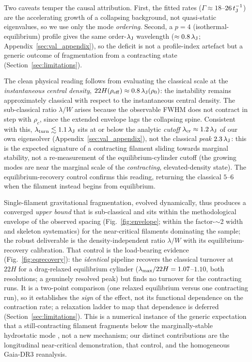 \documentclass[usenatbib,twoside,twocolumn]{mnras}
\begin{document}
Two caveats temper the causal attribution. First, the fitted rates ($\Gamma\approx18$--$26\,t_{\rm J}^{-1}$) are the accelerating growth of a collapsing background, not quasi-static eigenvalues, so we use only the mode \emph{ordering}. Second, a $p=4$ (isothermal-equilibrium) profile gives the same order-$\lambda_{\rm J}$ wavelength ($\approx0.8\,\lambda_{\rm J}$; Appendix~\ref{sec:val_appendix}), so the deficit is not a profile-index artefact but a generic outcome of fragmentation from a contracting state (Section~\ref{sec:limitations}).

The clean physical reading follows from evaluating the classical scale at the \emph{instantaneous central density}, $22H(\rho_{\rm eff})\approx0.8\,\lambda_{\rm J}(\rho_0)$: the instability remains approximately classical with respect to the instantaneous central density. The sub-classical ratio $\lambda/W$ arises because the observable FWHM does not contract in step with $\rho_c$, since the extended envelope lags the collapsing spine. Consistent with this, $\lambda_{\rm turn}\lesssim1.1\,\lambda_{\rm J}$ sits at or below the analytic \emph{cutoff} $\lambda_{\rm cr}\approx1.2\,\lambda_{\rm J}$ of our own eigensolver (Appendix~\ref{sec:val_appendix}), not the classical \emph{peak} $2.3\,\lambda_{\rm J}$: this is the expected signature of a contracting filament sliding towards marginal stability, not a re-measurement of the equilibrium-cylinder cutoff (the growing modes are near the marginal scale of the \emph{contracting}, elevated-density state). The equilibrium-recovery control confirms this reading, returning the classical $5$--$6$ when the filament instead begins from equilibrium.

Single-filament gravitational fragmentation, evolved dynamically, thus produces a converged \emph{upper bound} that is sub-classical and sits within the methodological envelope of the observed spacing (Fig.~\ref{fig:envelope}; within the factor-$\sim$2 width and skeleton systematics) for the near-critical filaments dominating the sample; the robust deliverable is the density-independent ratio $\lambda/W$ with its equilibrium-recovery calibration. That control is the load-bearing evidence (Fig.~\ref{fig:eqrecovery}): the \emph{identical} pipeline recovers the classical turnover at $22H$ for a drag-relaxed equilibrium cylinder ($\lambda_{\rm max}/22H=1.07$--$1.10$, both resolutions; a genuinely resolved peak) but finds no turnover for the contracting runs. It is a two-point comparison (one relaxed equilibrium versus one contracting run), so it establishes the \emph{sign} of the effect, not its functional dependence on the contraction rate; a relaxation ladder to map that dependence is deferred (Section~\ref{sec:limitations}). This is a numerical instance of the generic expectation that a still-contracting filament fragments below the marginally-stable hydrostatic mode \citep{Clarke2016,Clarke2017,Clarke2020}, not a new mechanism; our distinct contributions are the longitudinal near-critical demonstration, that control, and the homogeneous Gaia-DR3 reanalysis.
\end{document}
